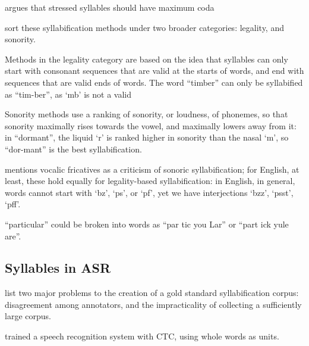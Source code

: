 \documentclass{article}[11pt]
\begin{document}
\citet{wells_syllabification_2019} argues 
that stressed syllables should have maximum coda

\citet{goslin_comparing_2007} sort these syllabification methods under two broader categories: legality, and sonority.

Methods in the legality category are based on the idea that syllables can only start with consonant sequences that are valid at the starts of words, and end with sequences that are valid ends of words. The word ``timber'' can only be syllabified as ``tim-ber'', as `mb' is not a valid 

Sonority methods use a ranking of sonority, or loudness, of phonemes, so that sonority maximally rises towards the vowel, and maximally lowers away from it: in ``dormant'', the liquid `r' is ranked higher in sonority than the nasal `m', so ``dor-mant'' is the best syllabification.

\citet{saussure_course_1959} mentions vocalic fricatives as a criticism of sonoric syllabification; for English, at least, these hold equally for legality-based syllabification: in English, in general, words cannot start with `bz', `ps', or `pf', yet we have interjections `bzz', `psst', `pff'.

``particular'' could be broken into words as ``par tic you Lar'' or ``part ick yule are''.

\subsection{Syllables in ASR}

\citep{fujimura_syllable_1975}

\citet{marchand_automatic_2009} list two major problems to the creation of a gold standard syllabification corpus: disagreement among annotators, and the impracticality of collecting a sufficiently large corpus.

\citet{soltau_neural_2017} trained a speech recognition system with CTC, using whole words as units.



%
\end{document}
